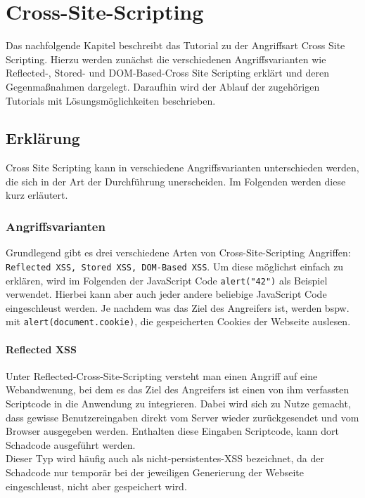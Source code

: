 \chapter{Cross-Site-Scripting}
\label{XSS}
Das nachfolgende Kapitel beschreibt das Tutorial zu der Angriffsart Cross Site Scripting. Hierzu werden zunächst die verschiedenen Angriffsvarianten wie Reflected-, Stored- und DOM-Based-Cross Site Scripting erklärt und deren Gegenmaßnahmen dargelegt. Daraufhin wird der Ablauf der zugehörigen Tutorials mit Lösungsmöglichkeiten beschrieben. 
\section{Erklärung}
Cross Site Scripting kann in verschiedene Angriffsvarianten unterschieden werden, die sich in der Art der Durchführung unerscheiden. Im Folgenden werden diese kurz erläutert. \\ 

\subsection{Angriffsvarianten}
Grundlegend gibt es drei verschiedene Arten von Cross-Site-Scripting Angriffen: \colorbox{altgray}{\lstinline|Reflected XSS, Stored XSS, DOM-Based XSS|}. Um diese möglichst einfach zu erklären, wird im Folgenden der JavaScript Code \colorbox{altgray}{\lstinline|alert("42")|} als Beispiel verwendet. Hierbei kann aber auch jeder andere beliebige JavaScript Code eingeschleust werden. Je nachdem was das Ziel des Angreifers ist, werden bspw. mit \colorbox{altgray}{\lstinline|alert(document.cookie)|}, die gespeicherten Cookies der Webseite auslesen. \\ 
\subsubsection*{Reflected XSS}
Unter Reflected-Cross-Site-Scripting versteht man einen Angriff auf eine Webandwenung, bei dem es
das Ziel des Angreifers ist einen von ihm verfassten Scriptcode in die Anwendung zu integrieren. Dabei wird sich zu Nutze gemacht, dass gewisse Benutzereingaben direkt vom Server wieder zurückgesendet und vom Browser ausgegeben werden. Enthalten diese Eingaben Scriptcode, kann dort Schadcode ausgeführt werden.\\
Dieser Typ wird häufig auch als nicht-persistentes-XSS bezeichnet, da der Schadcode nur temporär bei der jeweiligen Generierung der Webseite eingeschleust, nicht aber gespeichert wird.\\
